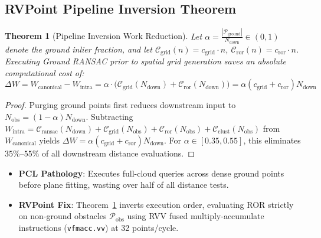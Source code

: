 \documentclass[11pt,a4paper]{article}
\newtheorem{theorem}{Theorem}[section]
\begin{document}
\subsection{RVPoint Pipeline Inversion Theorem}
\begin{theorem}[Pipeline Inversion Work Reduction]
\label{thm:inversion}
Let $\alpha = \frac{|\mathcal{P}_{\text{ground}}|}{N_{\text{down}}} \in (0, 1)$ denote the ground inlier fraction, and let $\mathcal{C}_{\text{grid}}(n) = c_{\text{grid}} \cdot n$, $\mathcal{C}_{\text{ror}}(n) = c_{\text{ror}} \cdot n$. Executing Ground RANSAC prior to spatial grid generation saves an absolute computational cost of:
\begin{equation}
\Delta W = W_{\text{canonical}} - W_{\text{intra}} = \alpha \cdot \Big( \mathcal{C}_{\text{grid}}(N_{\text{down}}) + \mathcal{C}_{\text{ror}}(N_{\text{down}}) \Big) = \alpha (c_{\text{grid}} + c_{\text{ror}}) N_{\text{down}}
\end{equation}
\end{theorem}
\begin{proof}
Purging ground points first reduces downstream input to $N_{\text{obs}} = (1 - \alpha) N_{\text{down}}$. Subtracting $W_{\text{intra}} = \mathcal{C}_{\text{ransac}}(N_{\text{down}}) + \mathcal{C}_{\text{grid}}(N_{\text{obs}}) + \mathcal{C}_{\text{ror}}(N_{\text{obs}}) + \mathcal{C}_{\text{clust}}(N_{\text{obs}})$ from $W_{\text{canonical}}$ yields $\Delta W = \alpha(c_{\text{grid}} + c_{\text{ror}})N_{\text{down}}$. For $\alpha \in [0.35, 0.55]$, this eliminates $35\%\text{--}55\%$ of all downstream distance evaluations.
\end{proof}

\begin{tcolorbox}[fixcmp, title={Stage Comparison: Outlier Removal}]
\begin{itemize}[leftmargin=1.2em, itemsep=0.1em]
    \item \textbf{PCL Pathology}: Executes full-cloud queries across dense ground points before plane fitting, wasting over half of all distance tests.
    \item \textbf{RVPoint Fix}: Theorem~\ref{thm:inversion} inverts execution order, evaluating ROR strictly on non-ground obstacles $\mathcal{P}_{\text{obs}}$ using RVV fused multiply-accumulate instructions (\texttt{vfmacc.vv}) at 32 points/cycle.
\end{itemize}
\end{tcolorbox}

\end{document}
